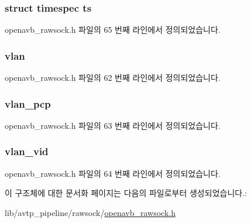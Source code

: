 \subsubsection[{\texorpdfstring{ts}{ts}}]{\setlength{\rightskip}{0pt plus 5cm}struct timespec ts}\hypertarget{structhdr__info__t_ad7bf7613b53788b73c72e70d5335e7c8}{}\label{structhdr__info__t_ad7bf7613b53788b73c72e70d5335e7c8}


openavb\+\_\+rawsock.\+h 파일의 65 번째 라인에서 정의되었습니다.

\subsubsection[{\texorpdfstring{vlan}{vlan}}]{ vlan}\hypertarget{structhdr__info__t_aae65321fd27fc2507a499a3f00660a93}{}\label{structhdr__info__t_aae65321fd27fc2507a499a3f00660a93}


openavb\+\_\+rawsock.\+h 파일의 62 번째 라인에서 정의되었습니다.

\subsubsection[{\texorpdfstring{vlan\+\_\+pcp}{vlan_pcp}}]{ vlan\+\_\+pcp}\hypertarget{structhdr__info__t_a394deccdf47e8dd6b4e6329e6fe0f8fc}{}\label{structhdr__info__t_a394deccdf47e8dd6b4e6329e6fe0f8fc}


openavb\+\_\+rawsock.\+h 파일의 63 번째 라인에서 정의되었습니다.

\subsubsection[{\texorpdfstring{vlan\+\_\+vid}{vlan_vid}}]{ vlan\+\_\+vid}\hypertarget{structhdr__info__t_aed62b55d4664ac7c198517a01adc4f6b}{}\label{structhdr__info__t_aed62b55d4664ac7c198517a01adc4f6b}


openavb\+\_\+rawsock.\+h 파일의 64 번째 라인에서 정의되었습니다.



이 구조체에 대한 문서화 페이지는 다음의 파일로부터 생성되었습니다.\+:\begin{DoxyCompactItemize}
\item 
lib/avtp\+\_\+pipeline/rawsock/\hyperlink{openavb__rawsock_8h}{openavb\+\_\+rawsock.\+h}\end{DoxyCompactItemize}
